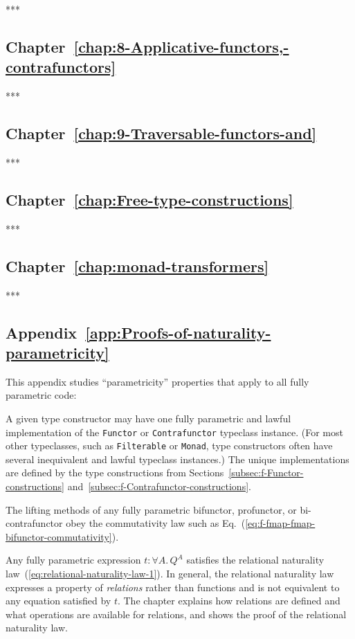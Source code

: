 {*}{*}{*}

\subsection{Chapter~\ref{chap:8-Applicative-functors,-contrafunctors}}

{*}{*}{*}

\subsection{Chapter~\ref{chap:9-Traversable-functors-and}}

{*}{*}{*}

\subsection{Chapter~\ref{chap:Free-type-constructions}}

{*}{*}{*}

\subsection{Chapter~\ref{chap:monad-transformers}}

{*}{*}{*}

\subsection{Appendix~\ref{app:Proofs-of-naturality-parametricity}}

This appendix studies \textsf{``}parametricity\textsf{''} properties that apply to
all fully parametric code:

A given type constructor may have one fully parametric and lawful
implementation of the \lstinline!Functor! or \lstinline!Contrafunctor!
typeclass instance. (For most other typeclasses, such as \lstinline!Filterable!
or \lstinline!Monad!, type constructors often have several inequivalent
and lawful typeclass instances.) The unique implementations are defined
by the type constructions from Sections~\ref{subsec:f-Functor-constructions}
and~\ref{subsec:f-Contrafunctor-constructions}.

The lifting methods of any fully parametric bifunctor, profunctor,
or bi-contrafunctor obey the commutativity law such as Eq.~(\ref{eq:f-fmap-fmap-bifunctor-commutativity}). 

Any fully parametric expression $t:\forall A.\,Q^{A}$ satisfies the
relational naturality law~(\ref{eq:relational-naturality-law-1}).
In general, the relational naturality law expresses a property of
\emph{relations} rather than functions and is not equivalent to any
equation satisfied by $t$. The chapter explains how relations are
defined and what operations are available for relations, and shows
the proof of the relational naturality law.

